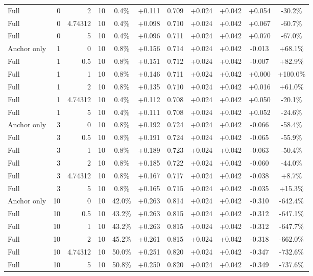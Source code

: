 \begin{table}[htbp]
\begin{tabular}{lrrrccccccc}
Full & 0 & 2 & 10 & 0.4\% & +0.111 & 0.709 & +0.024 & +0.042 & +0.054 & -30.2\% \\
Full & 0 & 4.74312 & 10 & 0.4\% & +0.098 & 0.710 & +0.024 & +0.042 & +0.067 & -60.7\% \\
Full & 0 & 5 & 10 & 0.4\% & +0.096 & 0.711 & +0.024 & +0.042 & +0.070 & -67.0\% \\
Anchor only & 1 & 0 & 10 & 0.8\% & +0.156 & 0.714 & +0.024 & +0.042 & -0.013 & +68.1\% \\
Full & 1 & 0.5 & 10 & 0.8\% & +0.151 & 0.712 & +0.024 & +0.042 & -0.007 & +82.9\% \\
Full & 1 & 1 & 10 & 0.8\% & +0.146 & 0.711 & +0.024 & +0.042 & +0.000 & +100.0\% \\
Full & 1 & 2 & 10 & 0.8\% & +0.135 & 0.710 & +0.024 & +0.042 & +0.016 & +61.0\% \\
Full & 1 & 4.74312 & 10 & 0.4\% & +0.112 & 0.708 & +0.024 & +0.042 & +0.050 & -20.1\% \\
Full & 1 & 5 & 10 & 0.4\% & +0.111 & 0.708 & +0.024 & +0.042 & +0.052 & -24.6\% \\
Anchor only & 3 & 0 & 10 & 0.8\% & +0.192 & 0.724 & +0.024 & +0.042 & -0.066 & -58.4\% \\
Full & 3 & 0.5 & 10 & 0.8\% & +0.191 & 0.724 & +0.024 & +0.042 & -0.065 & -55.9\% \\
Full & 3 & 1 & 10 & 0.8\% & +0.189 & 0.723 & +0.024 & +0.042 & -0.063 & -50.4\% \\
Full & 3 & 2 & 10 & 0.8\% & +0.185 & 0.722 & +0.024 & +0.042 & -0.060 & -44.0\% \\
Full & 3 & 4.74312 & 10 & 0.8\% & +0.167 & 0.717 & +0.024 & +0.042 & -0.038 & +8.7\% \\
Full & 3 & 5 & 10 & 0.8\% & +0.165 & 0.715 & +0.024 & +0.042 & -0.035 & +15.3\% \\
Anchor only & 10 & 0 & 10 & 42.0\% & +0.263 & 0.814 & +0.024 & +0.042 & -0.310 & -642.4\% \\
Full & 10 & 0.5 & 10 & 43.2\% & +0.263 & 0.815 & +0.024 & +0.042 & -0.312 & -647.1\% \\
Full & 10 & 1 & 10 & 43.2\% & +0.263 & 0.815 & +0.024 & +0.042 & -0.312 & -647.7\% \\
Full & 10 & 2 & 10 & 45.2\% & +0.261 & 0.815 & +0.024 & +0.042 & -0.318 & -662.0\% \\
Full & 10 & 4.74312 & 10 & 50.0\% & +0.251 & 0.820 & +0.024 & +0.042 & -0.347 & -732.6\% \\
Full & 10 & 5 & 10 & 50.8\% & +0.250 & 0.820 & +0.024 & +0.042 & -0.349 & -737.6\% \\

\end{tabular}
\end{table}
